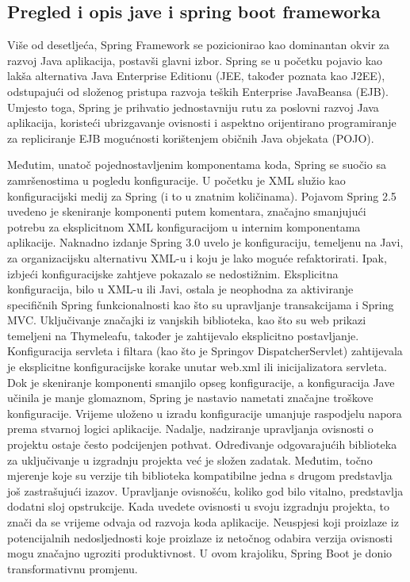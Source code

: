 \documentclass[a4paper,12pt,oneside]{article}
\begin{document}
\subsection{Pregled i opis jave i spring boot frameworka}

Više od desetljeća, Spring Framework se pozicionirao kao dominantan okvir za razvoj Java aplikacija, postavši glavni izbor. Spring se u početku pojavio kao lakša alternativa Java Enterprise Editionu (JEE, također poznata kao J2EE), odstupajući od složenog pristupa razvoja teških Enterprise JavaBeansa (EJB). Umjesto toga, Spring je prihvatio jednostavniju rutu za poslovni razvoj Java aplikacija, koristeći ubrizgavanje ovisnosti i aspektno orijentirano programiranje za repliciranje EJB mogućnosti korištenjem običnih Java objekata (POJO).

Međutim, unatoč pojednostavljenim komponentama koda, Spring se suočio sa zamršenostima u pogledu konfiguracije. U početku je XML služio kao konfiguracijski medij za Spring (i to u znatnim količinama). Pojavom Spring 2.5 uvedeno je skeniranje komponenti putem komentara, značajno smanjujući potrebu za eksplicitnom XML konfiguracijom u internim komponentama aplikacije. Naknadno izdanje Spring 3.0 uvelo je konfiguraciju, temeljenu na Javi, za organizacijsku alternativu XML-u i koju je lako moguće refaktorirati.
Ipak, izbjeći konfiguracijske zahtjeve pokazalo se nedostižnim. Eksplicitna konfiguracija, bilo u XML-u ili Javi, ostala je neophodna za aktiviranje specifičnih Spring funkcionalnosti kao što su upravljanje transakcijama i Spring MVC. Uključivanje značajki iz vanjskih biblioteka, kao što su web prikazi temeljeni na Thymeleafu, također je zahtijevalo eksplicitno postavljanje. Konfiguracija servleta i filtara (kao što je Springov DispatcherServlet) zahtijevala je eksplicitne konfiguracijske korake unutar web.xml ili inicijalizatora servleta. Dok je skeniranje komponenti smanjilo opseg konfiguracije, a konfiguracija Jave učinila je manje glomaznom, Spring je nastavio nametati značajne troškove konfiguracije. Vrijeme uloženo u izradu konfiguracije umanjuje raspodjelu napora prema stvarnoj logici aplikacije. Nadalje, nadziranje upravljanja ovisnosti o projektu ostaje često podcijenjen pothvat. Određivanje odgovarajućih biblioteka za uključivanje u izgradnju projekta već je složen zadatak. Međutim, točno mjerenje koje su verzije tih biblioteka kompatibilne jedna s drugom predstavlja još zastrašujući izazov. Upravljanje ovisnošću, koliko god bilo vitalno, predstavlja dodatni sloj opstrukcije. Kada uvedete ovisnosti u svoju izgradnju projekta, to znači da se vrijeme odvaja od razvoja koda aplikacije. Neuspjesi koji proizlaze iz potencijalnih nedosljednosti koje proizlaze iz netočnog odabira verzija ovisnosti mogu značajno ugroziti produktivnost. U ovom krajoliku, Spring Boot je donio transformativnu promjenu.\cite{springBootInAction}
\end{document}
